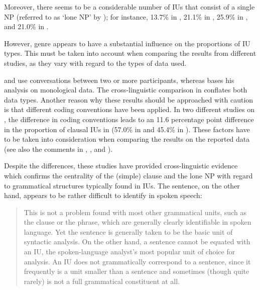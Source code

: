 Moreover, there seems to be a considerable number of IUs that consist of a single NP (referred to as `lone NP' by \citealt[12]{Croft_2007}); for instance, 13.7\% in  \citep[849]{Croft_1995}, 21.1\% in  \citep[11]{Croft_2007}, 25.9\% in  \citep[72]{Tao_1996}, and 21.0\% in  \citep[150]{Wouk_2008}.



However, genre appears to have a substantial influence on the proportions of IU types. This must be taken into account when comparing the results from different studies, as they vary with regard to the types of data used. 

\citet{Tao_1996, Wouk_2008, Matsumoto_2000, Schuetze-Coburn1994} and \citet{Park_2002} use conversations between two or more participants, whereas \citet{Croft_1995, Croft_2007} bases his analysis on monological data. The cross-linguistic comparison in \citet[12]{Croft_2007} conflates both data types. Another reason why these results should be approached with caution is that different coding conventions have been applied. In two different studies on , the difference in coding conventions leads to an 11.6 percentage point difference in the proportion of clausal IUs in  (57.0\% in \citealt[58]{Matsumoto_2000} and 45.4\% in \citealt[3]{IwasakiTao1993comparative}).  These factors have to be taken into consideration when comparing the results on the reported data (see also the comments in \citealt[642]{Park_2002}, \citealt[12]{Croft_2007}, and \citealt[139--144]{Wouk_2008}).

Despite the differences, these studies have provided cross-linguistic evidence which confirms the centrality of the (simple) clause and the lone NP with regard to grammatical structures typically found in IUs. The sentence, on the other hand, appears to be rather difficult to identify in spoken speech:




\begin{quotation}
	
	This is not a  problem  found with most  other  grammatical  units,  such  as the  clause or the phrase, which are generally clearly identifiable in spoken  language. Yet  the  sentence  is  generally  taken  to  be  the  basic  unit  of  syntactic analysis.  On  the  other  hand, a sentence cannot be equated with an IU, the spoken-language analyst's most popular unit of choice for analysis.
	An IU does not grammatically correspond to a sentence, since it frequently is a unit smaller than a sentence and sometimes (though quite rarely) is not a full grammatical constituent at all. \citep[841]{Croft_1995}
	
\end{quotation}


